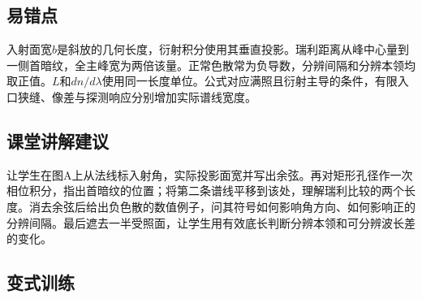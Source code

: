 \documentclass[UTF8,fontset=fandol,a4paper,11pt]{ctexart}
\begin{document}

\subsection*{易错点}

入射面宽$b$是斜放的几何长度，衍射积分使用其垂直投影。瑞利距离从峰中心量到一侧首暗纹，全主峰宽为两倍该量。正常色散常为负导数，分辨间隔和分辨本领均取正值。$L$和$d n/d\lambda$使用同一长度单位。公式对应满照且衍射主导的条件，有限入口狭缝、像差与探测响应分别增加实际谱线宽度。



\subsection*{课堂讲解建议}

让学生在图A上从法线标入射角，实际投影面宽并写出余弦。再对矩形孔径作一次相位积分，指出首暗纹的位置；将第二条谱线平移到该处，理解瑞利比较的两个长度。消去余弦后给出负色散的数值例子，问其符号如何影响角方向、如何影响正的分辨间隔。最后遮去一半受照面，让学生用有效底长判断分辨本领和可分辨波长差的变化。



\subsection*{变式训练}
\end{document}
